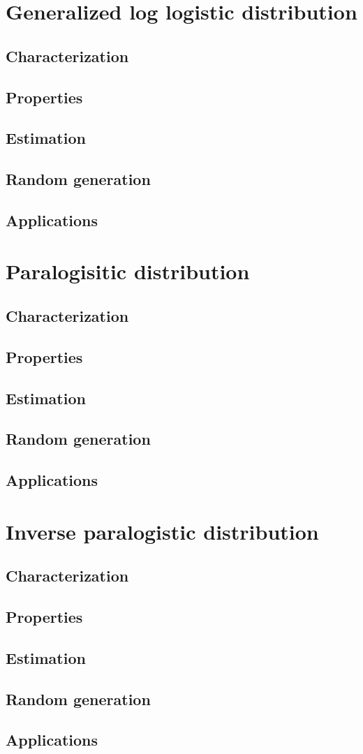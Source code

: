 \section{Generalized log logistic  distribution}
\subsection{Characterization}
\subsection{Properties}
\subsection{Estimation}
\subsection{Random generation}
\subsection{Applications}

\section{Paralogisitic distribution}
\subsection{Characterization}
\subsection{Properties}
\subsection{Estimation}
\subsection{Random generation}
\subsection{Applications}

\section{Inverse paralogistic distribution}
\subsection{Characterization}
\subsection{Properties}
\subsection{Estimation}
\subsection{Random generation}
\subsection{Applications}

